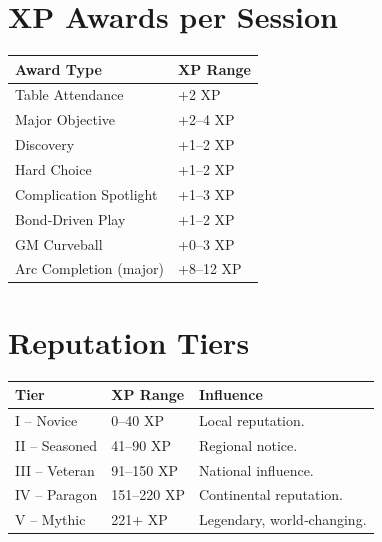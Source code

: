 \section*{XP Awards per Session}\label{sec:xp_awards_ref}

\begin{center}
\feTableStart
\begin{longtable}{l l}
\toprule
\textbf{Award Type} & \textbf{XP Range} \\
\midrule
Table Attendance & +2 XP \\
Major Objective & +2--4 XP \\
Discovery & +1--2 XP \\
Hard Choice & +1--2 XP \\
Complication Spotlight & +1--3 XP \\
Bond‑Driven Play & +1--2 XP \\
GM Curveball & +0--3 XP \\
Arc Completion (major) & +8--12 XP \\
\bottomrule
\end{longtable}
\end{center}

\section*{Reputation Tiers}\label{sec:reputation_tiers_ref}

\begin{center}
\feTableStart
\begin{longtable}{l l l}
\toprule
\textbf{Tier} & \textbf{XP Range} & \textbf{Influence} \\
\midrule
I -- Novice   & 0--40 XP   & Local reputation. \\
II -- Seasoned & 41--90 XP & Regional notice. \\
III -- Veteran & 91--150 XP & National influence. \\
IV -- Paragon & 151--220 XP & Continental reputation. \\
V -- Mythic   & 221+ XP   & Legendary, world‑changing. \\
\bottomrule
\end{longtable}
\end{center}


